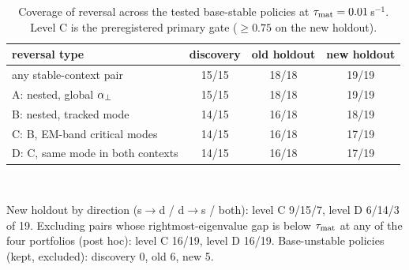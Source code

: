 \begin{table}[!t]
\centering
\caption{Coverage of reversal across the tested base-stable policies at $\tau_{\rm mat}=0.01$\,s$^{-1}$. Level C is the preregistered primary gate ($\ge0.75$ on the new holdout).}\label{tab:nested}
\footnotesize
\setlength{\tabcolsep}{3pt}
\begin{tabular}{@{}lccc@{}}
\toprule
reversal type & discovery & old holdout & new holdout \\
\midrule
any stable-context pair & 15/15 & 18/18 & 19/19 \\
A: nested, global $\alpha_{\perp}$ & 15/15 & 18/18 & 19/19 \\
B: nested, tracked mode & 14/15 & 16/18 & 18/19 \\
C: B, EM-band critical modes & 14/15 & 16/18 & 17/19 \\
D: C, same mode in both contexts & 14/15 & 16/18 & 17/19 \\
\bottomrule
\end{tabular}
\\[2pt]\parbox{\columnwidth}{\scriptsize New holdout by direction (s$\to$d / d$\to$s / both): level C 9/15/7, level D 6/14/3 of 19. Excluding pairs whose rightmost-eigenvalue gap is below $\tau_{\rm mat}$ at any of the four portfolios (post hoc): level C 16/19, level D 16/19. Base-unstable policies (kept, excluded): discovery 0, old 6, new 5.}
\end{table}
